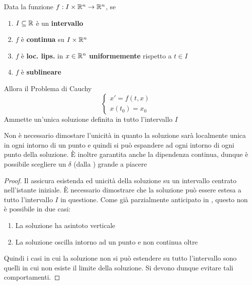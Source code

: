 \begin{theorem}
	\label{teo:cau_globale}
	Data la funzione $f: I \times \mathbb{R}^n \to \mathbb{R}^n$, se
	\begin{enumerate}
		\item $I \subseteq \mathbb{R}$ è un \textbf{intervallo}
		\item $f$ è \textbf{continua} su $I\times \mathbb{R}^n$
		\item $f$ è \textbf{loc. lips.} in $x  \in \mathbb{R}^n$ \textbf{uniformemente} rispetto a $t \in I$
		\item $f$ è \textbf{sublineare}
	\end{enumerate}
	Allora il Problema di Cauchy
	\begin{equation}
		\label{eq:cau_glob_thesis_prob}
		\begin{cases}
			x' = f(t,x)\\
			x(t_0) = x_0
		\end{cases}
	\end{equation}
	Ammette un'unica soluzione definita in tutto l'intervallo $I$
	\begin{note}
		Non è necessario dimostare l'unicità in quanto la soluzione sarà localmente unica in ogni intorno di un punto e quindi si può espandere ad ogni intorno di ogni punto della soluzione.\newline
		È inoltre garantita anche la dipendenza continua, dunque è possibile scegliere un $\delta$ (dalla ) grande a piacere
	\end{note}
	\begin{proof}
		Il  assicura esistenda ed unicità della soluzione su un intervallo centrato nell'istante iniziale. È necessario dimostrare che la soluzione può essere estesa a tutto l'intervallo $I$ in questione. Come già parzialmente anticipato in , questo non è possibile in due casi:
		\begin{enumerate}
			\item La soluzione ha asintoto verticale
			\item La soluzione oscilla intorno ad un punto e non continua oltre
		\end{enumerate}
		Quindi i casi in cui la soluzione non si può estendere su tutto l'intervallo sono quelli in cui non esiste il limite della soluzione. Si devono dunque evitare tali comportamenti.


\end{proof}
\end{theorem}
